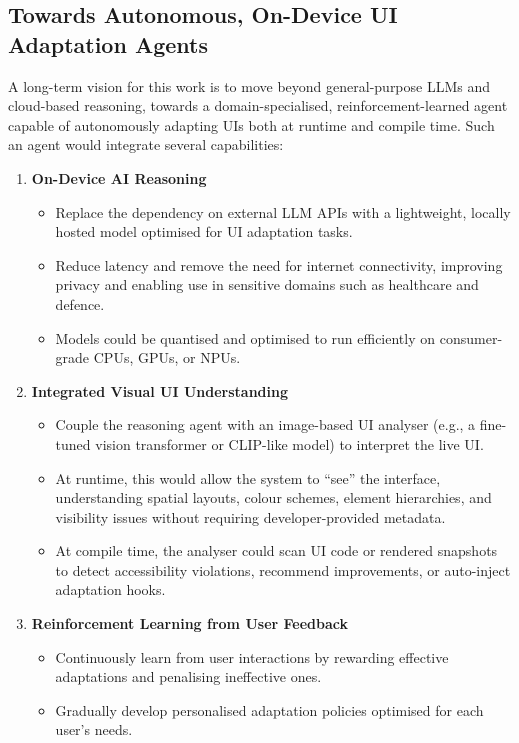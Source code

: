 \documentclass[openany]{book}
\begin{document}
\subsection{Towards Autonomous, On-Device UI Adaptation Agents}
A long-term vision for this work is to move beyond general-purpose LLMs and cloud-based reasoning, towards a domain-specialised, reinforcement-learned agent capable of autonomously adapting UIs both at runtime and compile time.
Such an agent would integrate several capabilities:
\begin{enumerate}
    \item \textbf{On-Device AI Reasoning}
        \begin{itemize}
            \item Replace the dependency on external LLM APIs with a lightweight, locally hosted model optimised for UI adaptation tasks.
            \item Reduce latency and remove the need for internet connectivity, improving privacy and enabling use in sensitive domains such as healthcare and defence.
            \item Models could be quantised and optimised to run efficiently on consumer-grade CPUs, GPUs, or NPUs.
        \end{itemize}
    \item \textbf{Integrated Visual UI Understanding}
        \begin{itemize}
            \item Couple the reasoning agent with an image-based UI analyser (e.g., a fine-tuned vision transformer or CLIP-like model) to interpret the live UI.
            \item At runtime, this would allow the system to ``see'' the interface, understanding spatial layouts, colour schemes, element hierarchies, and visibility issues without requiring developer-provided metadata.
            \item At compile time, the analyser could scan UI code or rendered snapshots to detect accessibility violations, recommend improvements, or auto-inject adaptation hooks.
        \end{itemize}
    \item \textbf{Reinforcement Learning from User Feedback}
        \begin{itemize}
            \item Continuously learn from user interactions by rewarding effective adaptations and penalising ineffective ones.
            \item Gradually develop personalised adaptation policies optimised for each user's needs.

\end{itemize}
\end{enumerate}
\end{document}
